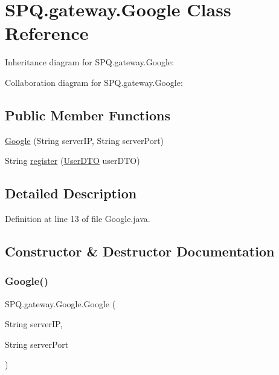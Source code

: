 \hypertarget{class_s_p_q_1_1gateway_1_1_google}{}\section{S\+P\+Q.\+gateway.\+Google Class Reference}
\label{class_s_p_q_1_1gateway_1_1_google}


Inheritance diagram for S\+P\+Q.\+gateway.\+Google\+:


Collaboration diagram for S\+P\+Q.\+gateway.\+Google\+:
\subsection*{Public Member Functions}
\begin{DoxyCompactItemize}
\item 
\mbox{\hyperlink{class_s_p_q_1_1gateway_1_1_google_a8b232ea9ca746c4500b6c02e86b76fef}{Google}} (String server\+IP, String server\+Port)
\item 
String \mbox{\hyperlink{class_s_p_q_1_1gateway_1_1_google_ab287ce4fd789224c45be6037a99a937b}{register}} (\mbox{\hyperlink{class_s_p_q_1_1dto_1_1_user_d_t_o}{User\+D\+TO}} user\+D\+TO)
\end{DoxyCompactItemize}


\subsection{Detailed Description}


Definition at line 13 of file Google.\+java.



\subsection{Constructor \& Destructor Documentation}
\mbox{\label{class_s_p_q_1_1gateway_1_1_google_a8b232ea9ca746c4500b6c02e86b76fef}} 
\subsubsection{\texorpdfstring{Google()}{Google()}}
{\footnotesize\ttfamily S\+P\+Q.\+gateway.\+Google.\+Google (\begin{DoxyParamCaption}\item[{String}]{server\+IP,  }\item[{String}]{server\+Port }\end{DoxyParamCaption})}



